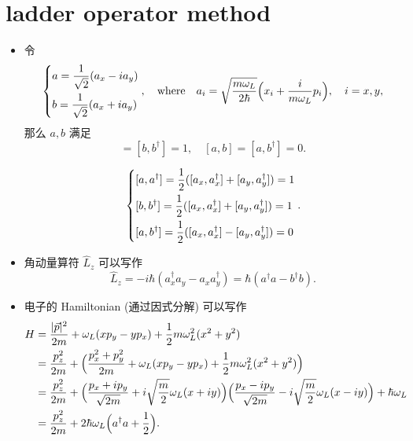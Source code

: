 \section{ladder operator method}
\begin{itemize}
	\item 令
	\begin{equation}
		\begin{dcases}
			a = \frac{1}{\sqrt{2}} (a_x - i a_y) \\
			b = \frac{1}{\sqrt{2}} (a_x + i a_y)
		\end{dcases}, \quad \text{where} \quad a_i = \sqrt{\frac{m \omega_L}{2 \hbar}} \Big( x_i + \frac{i}{m \omega_L} p_i \Big), \quad i = x, y,
	\end{equation}
	那么 $a, b$ 满足
	\begin{equation}
		[a, a^\dag] = [b, b^\dag] = 1, \quad [a, b] = [a, b^\dag] = 0.
	\end{equation}
	
	\begin{tcolorbox}[title=calculation:]
		\begin{equation}
			\begin{dcases}
				[a, a^\dag] = \frac{1}{2} ([a_x, a^\dag_x] + [a_y, a^\dag_y]) = 1 \\
				[b, b^\dag] = \frac{1}{2} ([a_x, a^\dag_x] + [a_y, a^\dag_y]) = 1 \\
				[a, b^\dag] = \frac{1}{2} ([a_x, a^\dag_x] - [a_y, a^\dag_y]) = 0
			\end{dcases}.
		\end{equation}
	\end{tcolorbox}
	
	\item 角动量算符 $\hat{L}_z$ 可以写作
	\begin{equation}
		\hat{L}_z = - i \hbar (a^\dag_x a_y - a_x a^\dag_y) = \hbar (a^\dag a - b^\dag b).
	\end{equation}
	
	\item 电子的 Hamiltonian (通过因式分解) 可以写作
	\begin{align}
		H &= \frac{|\vec{p}|^2}{2 m} + \omega_L (x p_y - y p_x) + \frac{1}{2} m \omega_L^2 (x^2 + y^2) \notag \\
		&= \frac{p_z^2}{2 m} + \Big( \frac{p_x^2 + p_y^2}{2 m} + \omega_L (x p_y - y p_x) + \frac{1}{2} m \omega_L^2 (x^2 + y^2) \Big) \notag \\
		&= \frac{p_z^2}{2 m} + \Big( \frac{p_x + i p_y}{\sqrt{2 m}} + i \sqrt{\frac{m}{2}} \omega_L (x + i y) \Big) \Big( \frac{p_x - i p_y}{\sqrt{2 m}} - i \sqrt{\frac{m}{2}} \omega_L (x - i y) \Big) + \hbar \omega_L \notag \\
		&= \frac{p_z^2}{2 m} + 2 \hbar \omega_L \Big( a^\dag a + \frac{1}{2} \Big).
	\end{align}
	

\end{itemize}
